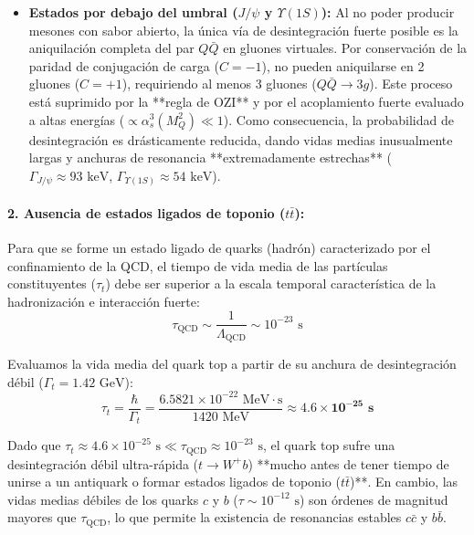 \begin{problema}
\begin{itemize}
    \item \textbf{Estados por debajo del umbral ($J/\psi$ y $\Upsilon(1S)$):} Al no poder producir mesones con sabor abierto, la única vía de desintegración fuerte posible es la aniquilación completa del par $Q\bar{Q}$ en gluones virtuales. Por conservación de la paridad de conjugación de carga ($C = -1$), no pueden aniquilarse en 2 gluones ($C=+1$), requiriendo al menos 3 gluones ($Q\bar{Q} \to 3g$). Este proceso está suprimido por la **regla de OZI** y por el acoplamiento fuerte evaluado a altas energías ($\propto \alpha_s^3(M_Q^2) \ll 1$). Como consecuencia, la probabilidad de desintegración es drásticamente reducida, dando vidas medias inusualmente largas y anchuras de resonancia **extremadamente estrechas** ($\Gamma_{J/\psi} \approx 93\text{ keV}$, $\Gamma_{\Upsilon(1S)} \approx 54\text{ keV}$).
\end{itemize}

\paragraph{2. Ausencia de estados ligados de toponio ($t\bar{t}$):}
Para que se forme un estado ligado de quarks (hadrón) caracterizado por el confinamiento de la QCD, el tiempo de vida media de las partículas constituyentes ($\tau_t$) debe ser superior a la escala temporal característica de la hadronización e interacción fuerte:
\begin{equation*}
\tau_{\text{QCD}} \sim \frac{1}{\Lambda_{\text{QCD}}} \sim 10^{-23}\text{ s}
\end{equation*}

Evaluamos la vida media del quark top a partir de su anchura de desintegración débil ($\Gamma_t = 1.42\text{ GeV}$):
\begin{equation*}
\tau_t = \frac{\hbar}{\Gamma_t} = \frac{6.5821 \times 10^{-22}\text{ MeV}\cdot\text{s}}{1420\text{ MeV}} \approx \mathbf{4.6 \times 10^{-25}\text{ s}}
\end{equation*}

Dado que $\tau_t \approx 4.6 \times 10^{-25}\text{ s} \ll \tau_{\text{QCD}} \approx 10^{-23}\text{ s}$, el quark top sufre una desintegración débil ultra-rápida ($t \to W^+ b$) **mucho antes de tener tiempo de unirse a un antiquark o formar estados ligados de toponio ($t\bar{t}$)**. En cambio, las vidas medias débiles de los quarks $c$ y $b$ ($\tau \sim 10^{-12}\text{ s}$) son órdenes de magnitud mayores que $\tau_{\text{QCD}}$, lo que permite la existencia de resonancias estables $c\bar{c}$ y $b\bar{b}$.
\end{problema}
